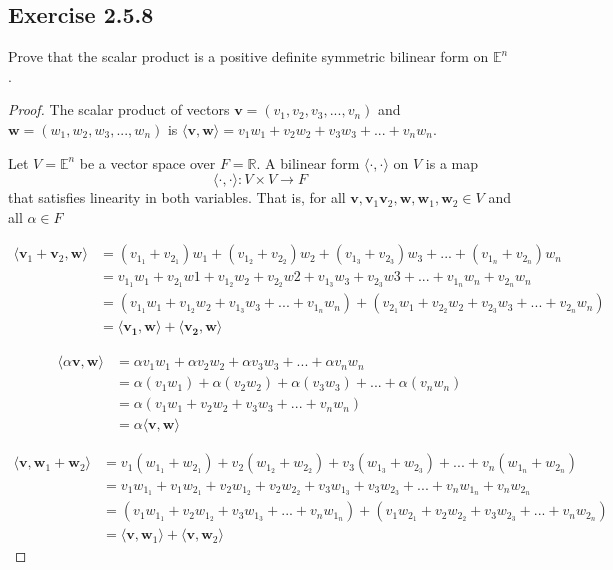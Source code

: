\documentclass{tufte-book}
\theoremstyle{mytheoremstyle}
\theoremstyle{mylemstyle}
\theoremstyle{mydefstyle}
\begin{document}
\subsection{Exercise 2.5.8}
Prove that the scalar product is a positive definite symmetric bilinear form on $\mathbb{E}^n$.

\begin{proof}
The scalar product of vectors $\mathbf{v} = (v_1, v_2, v_3,...,v_n)$ and $\mathbf{w} = (w_1, w_2, w_3,...,w_n)$ is $\langle\mathbf{v}, \mathbf{w}\rangle = v_1w_1 + v_2w_2 + v_3w_3 +...+ v_nw_n$.

Let $V = \mathbb{E}^n$ be a vector space over $F = \mathbb{R}$.  A bilinear form $\langle \cdot , \cdot \rangle$ on $V$ is a map
\[\langle \cdot, \cdot \rangle : V \times V \rightarrow F \]
that satisfies linearity in both variables.  That is, for all $\mathbf{v},\mathbf{v}_1\mathbf{v}_2,\mathbf{w},\mathbf{w}_1,\mathbf{w}_2 \in V$ and all $\alpha \in F$

\begin{align*}
\langle\mathbf{v}_1+\mathbf{v}_2, \mathbf{w} \rangle &= (v_{1_{1}}+v_{2_{1}})w_1 + (v_{1_{2}}+v_{2_{2}})w_2 + (v_{1_{3}}+v_{2_{3}})w_3 +...+(v_{1_{n}}+v_{2_{n}})w_n  \\
&= v_{1_{1}}w_1 + v_{2_{1}}w1 + v_{1_{2}}w_2 + v_{2_{2}}w2 + v_{1_{3}}w_3 + v_{2_{3}}w3 +...+v_{1_{n}}w_n + v_{2_{n}}w_n \\
&= (v_{1_{1}}w_1 + v_{1_{2}}w_2 + v_{1_{3}}w_3 +...+v_{1_{n}}w_n) + (v_{2_{1}}w_1 + v_{2_{2}}w_2 + v_{2_{3}}w_3 +...+v_{2_{n}}w_n)\\
&= \langle\mathbf{v_1},\mathbf{w} \rangle + \langle\mathbf{v_2},\mathbf{w} \rangle
\end{align*}

\begin{align*}
\langle \alpha \mathbf{v},\mathbf{w} \rangle &= \alpha v_1 w_1 + \alpha v_2 w_2 + \alpha v_3 w_3 +...+ \alpha v_n w_n \\
&= \alpha(v_1w_1) + \alpha(v_2w_2) + \alpha(v_3w_3) +...+\alpha(v_nw_n) \\
&=\alpha (v_1w_1 + v_2w_2 + v_3w_3 +...+v_nw_n) \\
&= \alpha \langle \mathbf{v}, \mathbf{w} \rangle
\end{align*}

\begin{align*}
\langle \mathbf{v}, \mathbf{w}_1+\mathbf{w}_2 \rangle &= v_1(w_{1_{1}}+w_{2_{1}}) + v_2(w_{1_{2}}+w_{2_{2}}) + v_3(w_{1_{3}}+w_{2_{3}}) +...+v_n(w_{1_{n}}+w_{2_{n}})  \\
&= v_1w_{1_{1}} + v_1w_{2_{1}} + v_2w_{1_{2}}+ v_2w_{2_{2}} + v_3w_{1_{3}}+ v_3w_{2_{3}} +...+v_nw_{1_{n}}+ v_nw_{2_{n}}\\
&= (v_1w_{1_{1}} + v_2w_{1_{2}} + v_3w_{1_{3}} +...+v_nw_{1_{n}}) +
(v_1w_{2_{1}} + v_2w_{2_{2}} + v_3w_{2_{3}} +...+v_nw_{2_{n}}) \\
&= \langle \mathbf{v}, \mathbf{w}_1 \rangle + \langle \mathbf{v}, \mathbf{w}_2 \rangle
\end{align*}


\end{proof}
\end{document}
